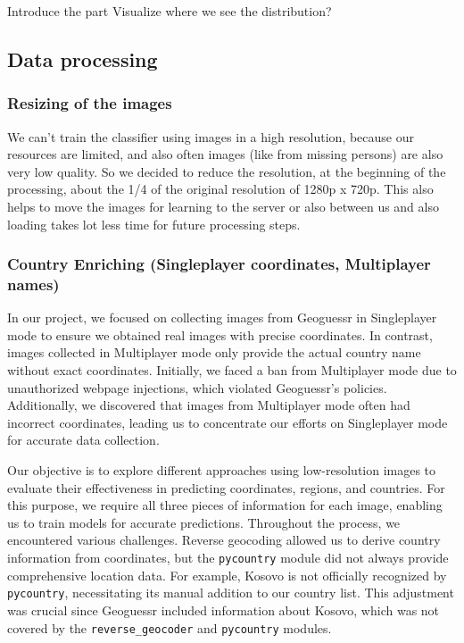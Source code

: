 Introduce the part Visualize where we see the distribution?

\subsection{Data processing}\label{data-processing}

\subsubsection{Resizing of the images}\label{resizing-of-the-images}

We can't train the classifier using images in a high resolution, because
our resources are limited, and also often images (like from missing
persons) are also very low quality. So we decided to reduce the
resolution, at the beginning of the processing, about the 1/4 of the
original resolution of 1280p x 720p. This also helps to move the images
for learning to the server or also between us and also loading takes lot
less time for future processing steps.

\subsubsection{Country Enriching (Singleplayer coordinates, Multiplayer
names)}\label{country-enriching-singleplayer-coordinates-multiplayer-names}

In our project, we focused on collecting images from Geoguessr in
Singleplayer mode to ensure we obtained real images with precise
coordinates. In contrast, images collected in Multiplayer mode only
provide the actual country name without exact coordinates. Initially, we
faced a ban from Multiplayer mode due to unauthorized webpage
injections, which violated Geoguessr's policies. Additionally, we
discovered that images from Multiplayer mode often had incorrect
coordinates, leading us to concentrate our efforts on Singleplayer mode
for accurate data collection.

Our objective is to explore different approaches using low-resolution
images to evaluate their effectiveness in predicting coordinates,
regions, and countries. For this purpose, we require all three pieces of
information for each image, enabling us to train models for accurate
predictions. Throughout the process, we encountered various challenges.
Reverse geocoding allowed us to derive country information from
coordinates, but the \texttt{pycountry} module did not always provide
comprehensive location data. For example, Kosovo is not officially
recognized by \texttt{pycountry}, necessitating its manual addition to
our country list. This adjustment was crucial since Geoguessr included
information about Kosovo, which was not covered by the
\texttt{reverse\_geocoder} and \texttt{pycountry} modules.

